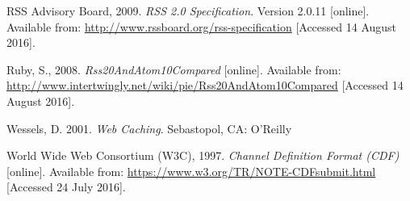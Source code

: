 \documentclass{article}
\begin{document}
\begin{thebibliography}{9}
RSS Advisory Board, 2009.
\textit{RSS 2.0 Specification}. Version 2.0.11 [online].
Available from: \url{http://www.rssboard.org/rss-specification} [Accessed 14 August 2016].

Ruby, S., 2008.
\textit{Rss20AndAtom10Compared} [online].
Available from: \url{http://www.intertwingly.net/wiki/pie/Rss20AndAtom10Compared} [Accessed 14 August 2016].

Wessels, D. 2001.
\textit{Web Caching}.
Sebastopol, CA: O'Reilly

World Wide Web Consortium (W3C), 1997.
\textit{Channel Definition Format (CDF)} [online].
Available from: \url{https://www.w3.org/TR/NOTE-CDFsubmit.html}
[Accessed 24 July 2016].

\end{thebibliography}
\end{document}
